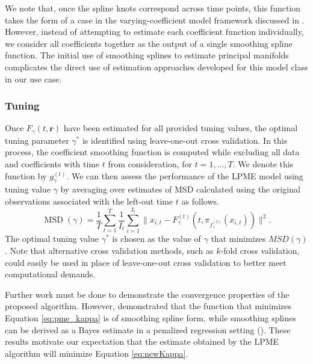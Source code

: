 \documentclass[11pt,reqno]{article}
\newcommand{\meng}[1]{{\color{purple} \sf $\clubsuit\clubsuit\clubsuit$ Kun Meng: [#1]}}
\theoremstyle{definition}
\begin{document}
We note that, once the spline knots correspond across time points, this function takes the form of a case in the varying-coefficient model framework discussed in \cite{hastieVaryingCoefficientModels1993}. However, instead of attempting to estimate each coefficient function individually, we consider all coefficients together as the output of a single smoothing spline function. The initial use of smoothing splines to estimate principal manifolds complicates the direct use of estimation approaches developed for this model class in our use case.

\subsubsection{Tuning}

Once $F_{\gamma}(t, \mathbf{r})$ have been estimated for all provided tuning values, the optimal tuning parameter $\gamma^*$ is identified using leave-one-out cross validation. In this process, the coefficient smoothing function is computed while excluding all data and coefficients with time $t$ from consideration, for $t = 1, \dots, T$. We denote this function by $g_{\gamma}^{(t)}$. We can then assess the performance of the LPME model using tuning value $\gamma$ by averaging over estimates of MSD calculated using the original observations associated with the left-out time $t$ as follows.
\begin{equation}
  \operatorname{MSD}(\gamma) = \frac{1}{T} \sum_{t=1}^{T}\frac{1}{I_t}\sum_{i=1}^{I_t}\|x_{i, t} - F_{\gamma}^{(t)}(t, \pi_{f_{\gamma}^{(t)}}(x_{i, t}))\|^2. \label{eq:18}
\end{equation}
The optimal tuning value $\gamma^*$ is chosen as the value of $\gamma$ that minimizes $MSD(\gamma)$. Note that alternative cross validation methods, such as $k$-fold cross validation, could easily be used in place of leave-one-out cross validation to better meet computational demands.

Further work must be done to demonstrate the convergence properties of the proposed algorithm. However, \cite{mengPrincipalManifoldEstimation2021} demonstrated that the function that minimizes Equation \ref{eq:pme_kappa} is of smoothing spline form, while smoothing splines can be derived as a Bayes estimate in a penalized regression setting (\cite{wahba1990}). These results motivate our expectation that the estimate obtained by the LPME algorithm will minimize Equation \ref{eq:newKappa}.

\end{document}
